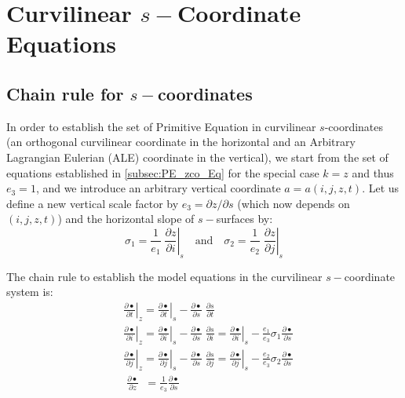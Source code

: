 \documentclass[../main/NEMO_manual]{subfiles}
\begin{document}
\chapter{Curvilinear $s-$Coordinate Equations}
\label{apdx:A}

\minitoc

\newpage

\section{Chain rule for $s-$coordinates}
\label{sec:A_chain}

In order to establish the set of Primitive Equation in curvilinear $s$-coordinates
(\ie an orthogonal curvilinear coordinate in the horizontal and
an Arbitrary Lagrangian Eulerian (ALE) coordinate in the vertical),
we start from the set of equations established in \autoref{subsec:PE_zco_Eq} for
the special case $k = z$ and thus $e_3 = 1$,
and we introduce an arbitrary vertical coordinate $a = a(i,j,z,t)$.
Let us define a new vertical scale factor by $e_3 = \partial z / \partial s$ (which now depends on $(i,j,z,t)$) and
the horizontal slope of $s-$surfaces by:
\begin{equation}
  \label{apdx:A_s_slope}
  \sigma_1 =\frac{1}{e_1 }\;\left. {\frac{\partial z}{\partial i}} \right|_s
  \quad \text{and} \quad
  \sigma_2 =\frac{1}{e_2 }\;\left. {\frac{\partial z}{\partial j}} \right|_s
\end{equation}

The chain rule to establish the model equations in the curvilinear $s-$coordinate system is:
\begin{equation}
  \label{apdx:A_s_chain_rule}
  \begin{aligned}
    &\left. {\frac{\partial \bullet }{\partial t}} \right|_z  =
    \left. {\frac{\partial \bullet }{\partial t}} \right|_s
	 -\frac{\partial \bullet }{\partial s}\;\frac{\partial s}{\partial t} \\
    &\left. {\frac{\partial \bullet }{\partial i}} \right|_z  =
    \left. {\frac{\partial \bullet }{\partial i}} \right|_s
    -\frac{\partial \bullet }{\partial s}\;\frac{\partial s}{\partial i}=
    \left. {\frac{\partial \bullet }{\partial i}} \right|_s
    -\frac{e_1 }{e_3 }\sigma_1 \frac{\partial \bullet }{\partial s} \\
    &\left. {\frac{\partial \bullet }{\partial j}} \right|_z  =
    \left. {\frac{\partial \bullet }{\partial j}} \right|_s
    - \frac{\partial \bullet }{\partial s}\;\frac{\partial s}{\partial j}=
    \left. {\frac{\partial \bullet }{\partial j}} \right|_s
    - \frac{e_2 }{e_3 }\sigma_2 \frac{\partial \bullet }{\partial s} \\
    &\;\frac{\partial \bullet }{\partial z}  \;\; = \frac{1}{e_3 }\frac{\partial \bullet }{\partial s}
  \end{aligned}
\end{equation}
\end{document}
